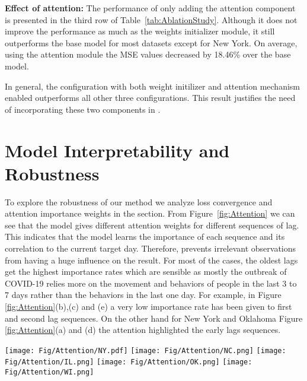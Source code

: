\documentclass[conference]{IEEEtran}
\begin{document}
\noindent\textbf{Effect of attention:} The performance of only adding the attention component is presented in the third row of Table~\ref{tab:AblationStudy}. Although it does not improve the performance as much as the weights initializer module, it still outperforms the base model for most datasets except for New York. On average, using the attention module the MSE values decreased by 18.46\% over the base model.

In general, the configuration with both weight initilizer and attention mechanism enabled outperforms all other three configurations. This result justifies the need of incorporating these two components in \name.


\section{Model Interpretability and Robustness}
To explore the robustness of our method we analyze loss convergence and attention importance weights in the section. From Figure~\ref{fig:Attention} we can see that the model gives different attention weights for different sequences of lag. This indicates that the model learns the importance of each sequence and its correlation to the current target day. Therefore, prevents irrelevant observations from having a huge influence on the result. For most of the cases, the oldest lags get the highest importance rates which are sensible as mostly the outbreak of COVID-19 relies more on the movement and behaviors of people in the last 3 to 7 days rather than the behaviors in the last one day. For example, in Figure \ref{fig:Attention}(b),(c) and (e) a very low importance rate has been given to first and second lag sequences. On the other hand for New York and Oklahoma Figure \ref{fig:Attention}(a) and (d) the attention highlighted the early lags sequences.


\begin{figure*}[!t]
\centering
{}
{\texttt{[image: Fig/Attention/NY.pdf]}}
{\texttt{[image: Fig/Attention/NC.png]}}
{\texttt{[image: Fig/Attention/IL.png]}}
{\texttt{[image: Fig/Attention/OK.png]}}
{\texttt{[image: Fig/Attention/WI.png]}}
\caption{Illustration of model interpreterability in terms of the attention weights for all case studies. }
\label{fig:Attention}
\end{figure*}
\end{document}
